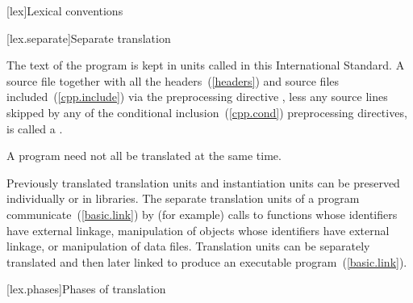 [lex]{Lexical conventions}



[lex.separate]{Separate translation}

\pnum
{}%
%
The text of the program is kept in units called
 in this International
Standard. A source file together with all the headers~(\ref{headers})
and source files included~(\ref{cpp.include}) via the preprocessing
directive , less any source lines skipped by any of the
conditional inclusion~(\ref{cpp.cond}) preprocessing directives, is
called a .
\begin{note} A \Cpp program need not all be translated at the same time.
\end{note}

\pnum
\begin{note} Previously translated translation units and instantiation
units can be preserved individually or in libraries. The separate
translation units of a program communicate~(\ref{basic.link}) by (for
example) calls to functions whose identifiers have external linkage,
manipulation of objects whose identifiers have external linkage, or
manipulation of data files. Translation units can be separately
translated and then later linked to produce an executable
program~(\ref{basic.link}). \end{note}%

[lex.phases]{Phases of translation}%

